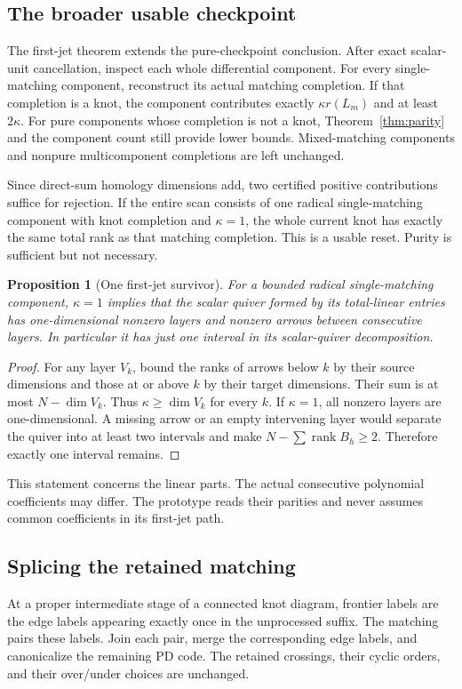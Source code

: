 \documentclass[11pt]{article}
\newtheorem{proposition}[theorem]{Proposition}
\theoremstyle{definition}\newtheorem{definition}[theorem]{Definition}\newtheorem{example}[theorem]{Example}
\theoremstyle{remark}\newtheorem{remark}[theorem]{Remark}
\newcommand{\rk}{\operatorname{rank}}
\begin{document}
\subsection{The broader usable checkpoint}
The first-jet theorem extends the pure-checkpoint conclusion. After exact scalar-unit cancellation, inspect each whole differential component. For every single-matching component, reconstruct its actual matching completion. If that completion is a knot, the component contributes exactly $\kappa r(L_m)$ and at least $2\kappa$. For pure components whose completion is not a knot, Theorem~\ref{thm:parity} and the component count still provide lower bounds. Mixed-matching components and nonpure multicomponent completions are left unchanged.

Since direct-sum homology dimensions add, two certified positive contributions suffice for rejection. If the entire scan consists of one radical single-matching component with knot completion and $\kappa=1$, the whole current knot has exactly the same total rank as that matching completion. This is a usable reset. Purity is sufficient but not necessary.

\begin{proposition}[One first-jet survivor]\label{prop:onejet}
For a bounded radical single-matching component, $\kappa=1$ implies that the scalar quiver formed by its total-linear entries has one-dimensional nonzero layers and nonzero arrows between consecutive layers. In particular it has just one interval in its scalar-quiver decomposition.
\end{proposition}
\begin{proof}
For any layer $V_k$, bound the ranks of arrows below $k$ by their source dimensions and those at or above $k$ by their target dimensions. Their sum is at most $N-\dim V_k$. Thus $\kappa\ge\dim V_k$ for every $k$. If $\kappa=1$, all nonzero layers are one-dimensional. A missing arrow or an empty intervening layer would separate the quiver into at least two intervals and make $N-\sum\rk B_h\ge2$. Therefore exactly one interval remains.
\end{proof}

This statement concerns the linear parts. The actual consecutive polynomial coefficients may differ. The prototype reads their parities and never assumes common coefficients in its first-jet path.

\subsection{Splicing the retained matching}
At a proper intermediate stage of a connected knot diagram, frontier labels are the edge labels appearing exactly once in the unprocessed suffix. The matching pairs these labels. Join each pair, merge the corresponding edge labels, and canonicalize the remaining PD code. The retained crossings, their cyclic orders, and their over/under choices are unchanged.
\end{document}
